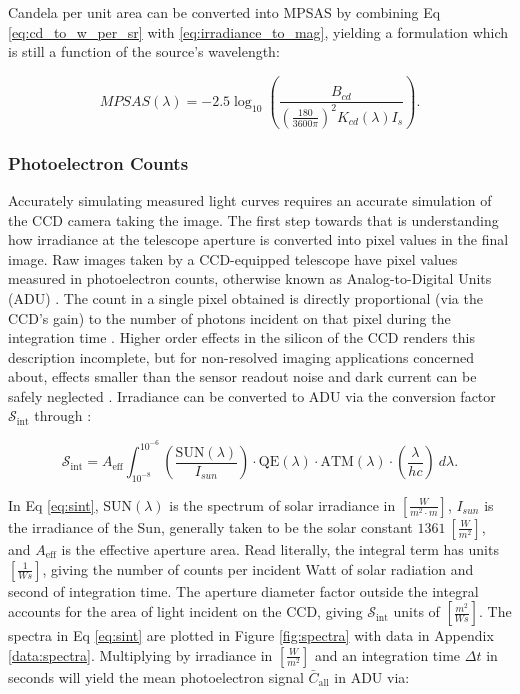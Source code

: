 Candela per unit area can be converted into MPSAS by combining Eq \ref{eq:cd_to_w_per_sr} with \ref{eq:irradiance_to_mag}, yielding a formulation which is still a function of the source's wavelength:

\begin{equation} \label{eq:cd_per_m2_to_mpsas}
  MPSAS(\lambda) = -2.5 \log_{10}\left( \frac{B_{cd}}{\left( \frac{180}{ 3600\pi} \right)^2 K_{cd}(\lambda) I_s} \right).
\end{equation}

\subsubsection{Photoelectron Counts}

Accurately simulating measured light curves requires an accurate simulation of the CCD camera taking the image. The first step towards that is understanding how irradiance at the telescope aperture is converted into pixel values in the final image. Raw images taken by a CCD-equipped telescope have pixel values measured in photoelectron counts, otherwise known as Analog-to-Digital Units (ADU) \cite{krag2003}. The count in a single pixel obtained is directly proportional (via the CCD's gain) to the number of
photons incident on that pixel during the integration time \cite{krag2003}. Higher order effects in the silicon of
the CCD renders this description incomplete, but for non-resolved imaging applications
concerned about, effects smaller than the sensor readout noise and dark current can be safely neglected
\cite{frueh2019notes}. Irradiance can be converted to ADU via the conversion factor $\mathcal{S}_\mathrm{int}$
through \cite{krag2003}:

\begin{equation} \label{eq:sint}
 \mathcal{S}_\mathrm{int} = A_\mathrm{eff}
	\int_{10^{-8}}^{10^{-6}}{ \left( \frac{\textrm{SUN}(\lambda)}{I_{sun}} \right) \cdot \textrm{QE}(\lambda) \cdot \textrm{ATM}(\lambda)
  \cdot \left( \frac{\lambda}{h c} \right) \: d\lambda}.
\end{equation}

In Eq \ref{eq:sint}, $\textrm{SUN}(\lambda)$ is the spectrum of solar irradiance in 
$\left[\frac{W}{m^2\cdot m} \right]$, $I_{sun}$ is the irradiance of the Sun, generally taken to be
the solar constant $1361 \: \left[ \frac{W}{m^2} \right]$, and $A_\mathrm{eff}$ is the effective aperture area. Read literally, the integral term has
units $\left[ \frac{1}{Ws} \right]$, giving the number of counts per incident Watt of solar
radiation and second of integration time. The aperture diameter factor outside the integral accounts
for the area of light incident on the CCD, giving $\mathcal{S}_\mathrm{int}$ units of $\left[ \frac{m^2}{Ws}
\right]$. The spectra in Eq \ref{eq:sint} are plotted in Figure \ref{fig:spectra} with data in Appendix \ref{data:spectra}. Multiplying by irradiance in $\left[ \frac{W}{m^2} \right]$ and an integration time $\Delta t$ 
in seconds will yield the mean photoelectron signal $\bar{C}_\mathrm{all}$ in ADU via:

